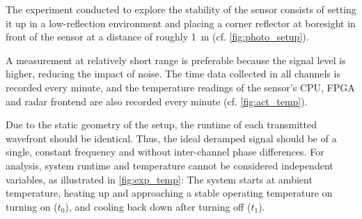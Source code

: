 The experiment conducted to explore the stability of the sensor consists of setting it up
in a low-reflection environment and placing a corner reflector
at boresight in front of the sensor at a distance of roughly \SI{1}{\m} (cf. \ref{fig:photo_setup}).

A measurement at relatively short range is preferable because the signal level is higher,
reducing the impact of noise. The time data collected in all channels is recorded every minute,
and the temperature readings of the sensor's CPU, FPGA and radar frontend
are also recorded every minute (cf. \ref{fig:act_temp}).

Due to the static geometry of the setup, the runtime of each transmitted wavefront should be identical.
Thus, the ideal deramped signal should be of a single, constant frequency and without inter-channel phase differences.
For analysis, system runtime and temperature cannot be considered independent variables, as illustrated in \cref{fig:exp_temp}:
The system starts at ambient temperature, heating up and approaching a stable operating temperature on turning on ($t_0$),
and cooling back down after turning off ($t_1$).


